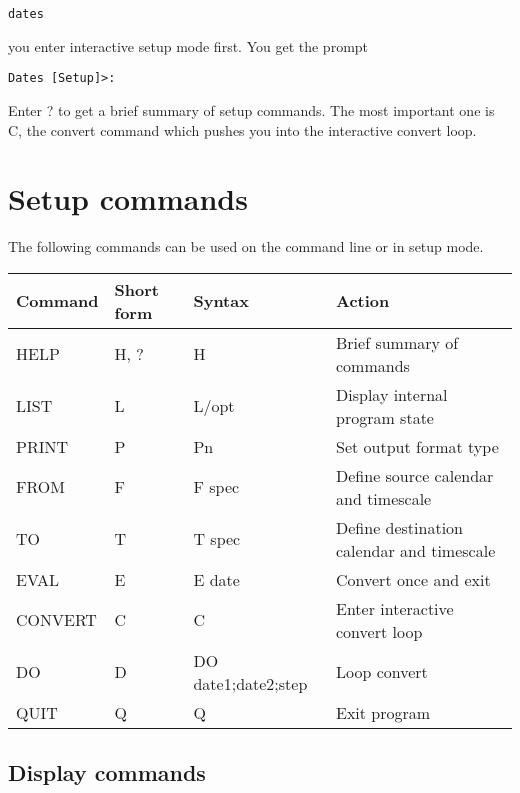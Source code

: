 \documentclass{article}
\begin{document}
\begin{verbatim}
dates
\end{verbatim}
you enter interactive setup mode first. You get the prompt
\begin{verbatim}
Dates [Setup]>:
\end{verbatim}
Enter ? to get a brief summary of setup commands. The most 
important one is C, the convert command which pushes you
into the interactive convert loop.

\section{Setup commands}

The following commands can be used on the command line
or in setup mode.

\begin{longtable}{llll}
Command & Short form & Syntax & Action\\
\hline
HELP    & H, ?      & H       & Brief summary of commands\\
LIST    & L         & L/opt   & Display internal program state\\
PRINT   & P         & Pn      & Set output format type \\
FROM    & F         & F spec  & Define source calendar and timescale\\
TO      & T         & T spec  & Define destination calendar and timescale\\
EVAL    & E         & E date  & Convert once and exit\\
CONVERT & C         & C       & Enter interactive convert loop\\
DO      & D         & DO date1;date2;step& Loop convert\\
QUIT    & Q         & Q       & Exit program\\
\end{longtable}

\subsection{Display commands}
\end{document}
